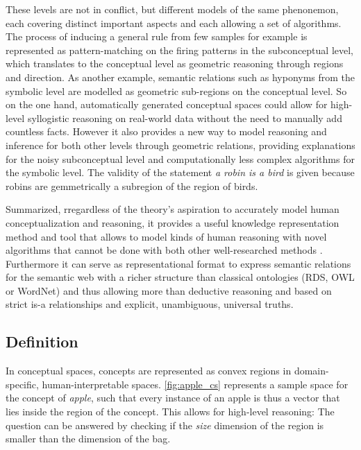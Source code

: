 These levels are not in conflict, but different models of the same phenonemon, each covering distinct important aspects and each allowing a set of algorithms. The process of inducing a general rule from few samples for example is represented as pattern-matching on the firing patterns in the subconceptual level, which translates to the conceptual level as geometric reasoning through regions and direction. As another example, semantic relations such as hyponyms from the symbolic level are modelled as geometric sub-regions on the conceptual level. So on the one hand, automatically generated conceptual spaces could allow for high-level syllogistic reasoning on real-world data without the need to manually add countless facts. However it also provides a new way to model reasoning and inference for both other levels through geometric relations, providing explanations for the noisy subconceptual level and computationally less complex algorithms for the symbolic level. The validity of the statement \textit{a robin is a bird} is given because robins are gemmetrically a subregion of the region of birds.

Summarized, rregardless of the theory's aspiration to accurately model human conceptualization and reasoning, it provides a useful knowledge representation method and tool that allows to model kinds of human reasoning with novel algorithms that cannot be done with both other well-researched methods \cite[Sec.~6.7]{Gardenfors2000a}. Furthermore it can serve as representational format to express semantic relations for the semantic web \cite{Gardenfors2004} with a richer structure than classical ontologies (\eg RDS, OWL or WordNet) and thus allowing more than deductive reasoning and based on strict is-a relationships and explicit, unambiguous, universal truths.

\subsection*{Definition}

In conceptual spaces, concepts are represented as convex regions in domain-specific, human-interpretable spaces. \autoref{fig:apple_cs} represents a sample space for the concept of \textit{apple}, such that every instance of an apple is thus a vector that lies inside the region of the concept. This allows for high-level reasoning: The question \textit{} can be answered by checking if the \textit{size} dimension of the region is smaller than the dimension of the bag.

